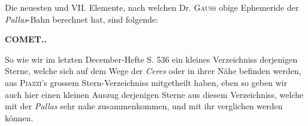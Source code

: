 Die neuesten und VII. Elemente, nach welchen Dr. \textsc{Gauss} obige Ephemeride der \emph{Pallas}-Bahn berechnet hat, sind folgende:

\begin{center}
\begingroup\fontsize{9}{11}\selectfont\setlength{\tabcolsep}{3pt}
%
\ifdim\wd0>\linewidth\resizebox{\linewidth}{!}{\usebox{0}}\else\usebox{0}\fi\endgroup
\end{center}
\clearpage
\endgroup
\begingroup
\pagestyle{empty}
\newcommand{\GaussVIGathering}[2]{%
  \fancypagestyle{gaussVIGathering}{%
    \fancyhf{}%
    \renewcommand{\headrulewidth}{0pt}%
    \renewcommand{\footrulewidth}{0pt}%
    \fancyfoot[C]{\makebox[\textwidth][l]{%
      \hspace*{.025\textwidth}{\footnotesize\bfseries #1}\hfill
      {\normalsize\bfseries\textls[90]{#2}}\hspace*{.18\textwidth}}}%
  }%
  \thispagestyle{gaussVIGathering}%
}
\thispagestyle{empty}
\noindent{}%
\makebox[12mm][l]{}%
\parbox[t]{\dimexpr\linewidth-24mm\relax}{\centering\footnotesize\bfseries COMET..\par}%
\par\nobreak\medskip
\par\indent So wie wir im letzten December-Hefte S. 536 ein kleines Verzeichniss derjenigen Sterne, welche sich auf dem Wege der \emph{Ceres} oder in ihrer Nähe befinden werden, aus \textsc{Piazzi}'s grossem Stern-Verzeichniss mitgetheilt haben, eben so geben wir auch hier einen kleinen Auszug derjenigen Sterne aus diesem Verzeichniss, welche mit der \emph{Pallas} sehr nahe zusammenkommen, und mit ihr verglichen werden können.

